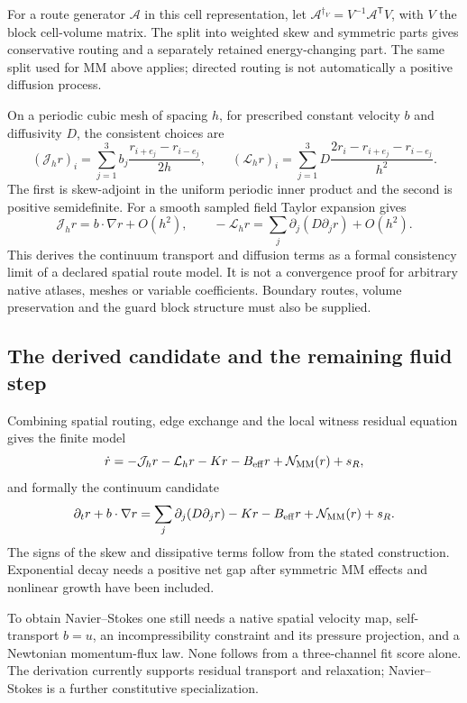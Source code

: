 \documentclass[11pt,a4paper]{article}
\begin{document}
For a route generator $\mathcal A$ in this cell representation, let
$\mathcal A^{\dagger_V}=V^{-1}\mathcal A^{\mathsf T}V$, with $V$
the block cell-volume matrix. The split into weighted skew and symmetric
parts gives conservative routing and a separately retained energy-changing
part. The same split used for MM above applies; directed routing is not
automatically a positive diffusion process.

On a periodic cubic mesh of spacing $h$, for prescribed constant velocity
$b$ and diffusivity $D$, the consistent choices are
\[
(\mathcal J_hr)_i
=\sum_{j=1}^3 b_j\frac{r_{i+e_j}-r_{i-e_j}}{2h},
\qquad
(\mathcal L_hr)_i
=\sum_{j=1}^3 D\frac{2r_i-r_{i+e_j}-r_{i-e_j}}{h^2}.
\]
The first is skew-adjoint in the uniform periodic inner product and the
second is positive semidefinite. For a smooth sampled field Taylor
expansion gives
\[
\mathcal J_hr=b\cdot\nabla r+O(h^2),\qquad
-\mathcal L_hr=\sum_j\partial_j(D\partial_jr)+O(h^2).
\]
This derives the continuum transport and diffusion terms as a formal
consistency limit of a declared spatial route model. It is not a convergence
proof for arbitrary native atlases, meshes or variable coefficients.
Boundary routes, volume preservation and the guard block structure must
also be supplied.

\subsection{The derived candidate and the remaining fluid step}
Combining spatial routing, edge exchange and the local witness residual
equation gives the finite model
\[
\dot r=-\mathcal J_hr-\mathcal L_hr-Kr-B_{\rm eff}r
+\mathcal N_{\rm MM}(r)+s_R,
\]
and formally the continuum candidate
\[
\partial_t r+b\cdot\nabla r
=\sum_j\partial_j(D\partial_jr)-Kr-B_{\rm eff}r
+\mathcal N_{\rm MM}(r)+s_R.
\]
The signs of the skew and dissipative terms follow from the stated
construction. Exponential decay needs a positive net gap after symmetric
MM effects and nonlinear growth have been included.

To obtain Navier--Stokes one still needs a native spatial velocity map,
self-transport $b=u$, an incompressibility constraint and its pressure
projection, and a Newtonian momentum-flux law. None follows from a
three-channel fit score alone. The derivation currently supports residual
transport and relaxation; Navier--Stokes is a further constitutive specialization.
\end{document}
